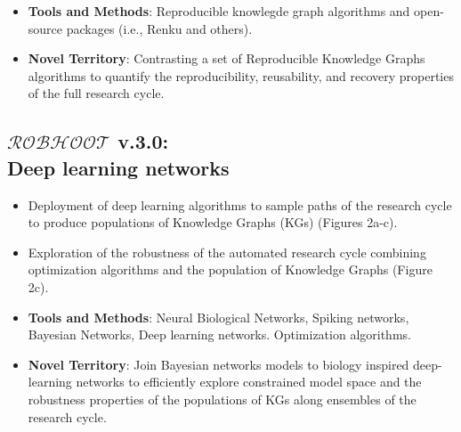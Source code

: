 \documentclass[10pt, a4paper, twocolumn]{article} %
\begin{document}
   \begin{itemize}
   \item {\bf Tools and Methods}: Reproducible knowlegde graph
     algorithms and open-source packages (i.e., Renku and others).
   \end{itemize}

    \begin{itemize}
    \item {\bf Novel Territory}: Contrasting a set of Reproducible
      Knowledge Graphs algorithms to quantify the reproducibility,
      reusability, and recovery properties of the full research cycle.
   \end{itemize}

  
  \subsection{{\bf $\mathcal{ROBHOOT}$ v.3.0}: \\ Deep learning networks}
  \begin{itemize}
  \item Deployment of deep learning algorithms to sample paths of the
    research cycle to produce populations of Knowledge Graphs (KGs)
    (Figures 2a-c).
  \item Exploration of the robustness of the automated research cycle
    combining optimization algorithms and the population of Knowledge
    Graphs (Figure 2c).
  \end{itemize}

 \begin{itemize}
 \item {\bf Tools and Methods}: Neural Biological Networks, Spiking
   networks, Bayesian Networks, Deep learning networks. Optimization
   algorithms.
 \end{itemize}

  \begin{itemize}
  \item {\bf Novel Territory}: Join Bayesian networks models to
    biology inspired deep-learning networks to efficiently explore
    constrained model space and the robustness properties of the
    populations of KGs along ensembles of the research cycle.
   \end{itemize}
  
  
\end{document}
